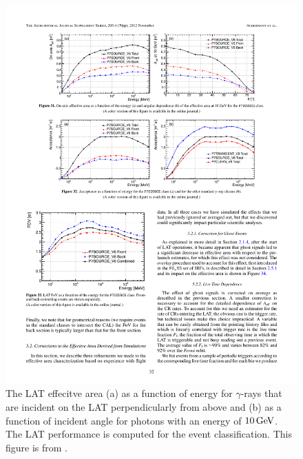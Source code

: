 \begin{figure}[htbp]
  \centering
  \includegraphics{chapters/introduction/figures/lat_effective_area.pdf}
  \caption{
  The \ac{LAT} effecitve area (a) as a function of energy for
  $\gamma$-rays that are incident on the \ac{LAT} perpendicularly from
  above and (b) as a function of incident angle for photons with an
  energy of $10\,\text{GeV}$.  The \ac{LAT} performance is computed
  for the \psevensourcevsix event classification.  This figure is from
  \cite{ackermann_2012a_fermi-large}.
  }
\end{figure} 

